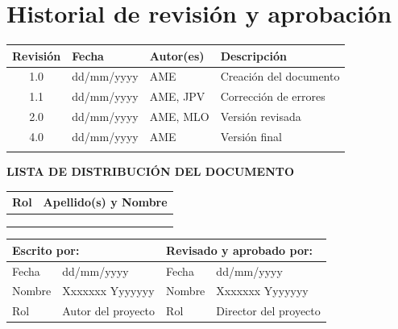 \vspace*{0cm}

\chapter*{Historial de revisión y aprobación}
{}

\begin{tabularx}{\textwidth}{|c|l|l|X|}
  \hline
    \textbf{Revisión} & \textbf{Fecha} & \textbf{Autor(es)} & \textbf{Descripción} \\
  \hline
    1.0 & dd/mm/yyyy & AME & Creación del documento \\
  \hline
    1.1 & dd/mm/yyyy & AME, JPV & Corrección de errores \\
  \hline
    2.0 & dd/mm/yyyy & AME, MLO & Versión revisada \\
  \hline
    4.0 & dd/mm/yyyy & AME & Versión final \\
  \hline
    & & & \\
  \hline
\end{tabularx}

\vspace{1cm}

\textbf{LISTA DE DISTRIBUCIÓN DEL DOCUMENTO}

\begin{tabularx}{\textwidth}{|l|X|}
  \hline
    \textbf{Rol} & \textbf{Apellido(s) y Nombre} \\
  \hline
    [Estudiante] &  \\
  \hline
    [Director del proyecto] &  \\
  \hline
    [Director 2 (sólo si aplica)] &  \\
  \hline
\end{tabularx}

\vspace{1cm}

\begin{tabularx}{\textwidth}{|l|X||l|X|}
  \hline
    \multicolumn{2}{|l||}{\textbf{Escrito por:}}  &  \multicolumn{2}{l|}{\textbf{Revisado y aprobado por:}} \\
  \hline
    Fecha &  dd/mm/yyyy & Fecha &  dd/mm/yyyy \\
  \hline
    Nombre &  Xxxxxxx Yyyyyyy & Nombre &  Xxxxxxx Yyyyyyy \\
  \hline
    Rol & Autor del proyecto & Rol & Director del proyecto \\
  \hline
\end{tabularx}
